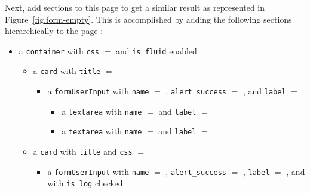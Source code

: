 \documentclass[a4paper,oneside]{book}
\begin{document}
Next, add sections to this page to get a similar result as represented in Figure~\ref{fig.form-empty}.
This is accomplished by adding the following sections hierarchically to the page :
\begin{itemize}
    \item a \texttt{container} with \texttt{css} $=$  and \texttt{is\_fluid} enabled
        \begin{itemize}
            \item a \texttt{card} with \texttt{title} $=$ 
                \begin{itemize}
                    \item a \texttt{formUserInput} with \texttt{name} $=$ , \texttt{alert\_success} $=$ , and \texttt{label} $=$ 
                        \begin{itemize}
                            \item a \texttt{textarea} with \texttt{name} $=$  and \texttt{label} $=$ 
                            \item a \texttt{textarea} with \texttt{name} $=$  and \texttt{label} $=$ 
                        \end{itemize}
                \end{itemize}
            \item a \texttt{card} with \texttt{title}  and \texttt{css} $=$ 
                \begin{itemize}
                    \item a \texttt{formUserInput} with \texttt{name} $=$ , \texttt{alert\_success} $=$ , \texttt{label} $=$ , and with \texttt{is\_log} checked
                        \begin{itemize}

\end{itemize}
\end{itemize}
\end{itemize}
\end{itemize}
\end{document}
